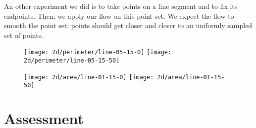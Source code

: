
An other experiment we did is to take points on a line segment and to fix its
endpoints. Then, we apply our flow on this point set. We expect the flow to
smooth the point set: points should get closer and closer to an uniformly
sampled set of points.

\begin{figure}[H]
    \centering

    \texttt{[image: 2d/perimeter/line-05-15-0]}
    \texttt{[image: 2d/perimeter/line-05-15-50]}
    \label{fig:line_fixed_perimeter}

    \texttt{[image: 2d/area/line-01-15-0]}
    \texttt{[image: 2d/area/line-01-15-50]}
    \label{fig:line_fixed_area}
\end{figure}


\section{Assessment}



